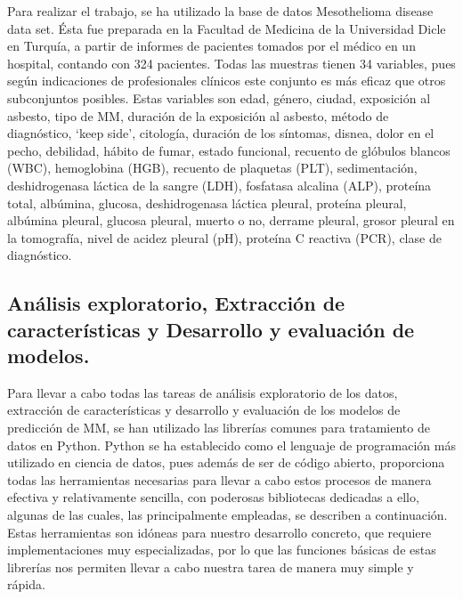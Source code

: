 \documentclass{article}
\begin{document}
Para realizar el trabajo, se ha utilizado la base de datos
Mesothelioma disease data set. Ésta fue preparada en la Facultad de
Medicina de la Universidad Dicle en Turquía, a partir de informes de
pacientes tomados por el médico en un hospital, contando con 324
pacientes. Todas las muestras tienen 34 variables, pues según
indicaciones de profesionales clínicos este conjunto es más eficaz que
otros subconjuntos posibles. Estas variables son edad, género, ciudad,
exposición al asbesto, tipo de MM, duración de la exposición al
asbesto, método de diagnóstico, ‘keep side’, citología, duración de
los síntomas, disnea, dolor en el pecho, debilidad, hábito de fumar,
estado funcional, recuento de glóbulos blancos (WBC), hemoglobina
(HGB), recuento de plaquetas (PLT), sedimentación, deshidrogenasa
láctica de la sangre (LDH), fosfatasa alcalina (ALP), proteína total,
albúmina, glucosa, deshidrogenasa láctica pleural, proteína pleural,
albúmina pleural, glucosa pleural, muerto o no, derrame pleural,
grosor pleural en la tomografía, nivel de acidez pleural (pH),
proteína C reactiva (PCR), clase de diagnóstico.


\subsection{Análisis exploratorio, Extracción de características y Desarrollo y evaluación de modelos.}

Para llevar a cabo todas las tareas de análisis exploratorio de los
datos, extracción de características y desarrollo y evaluación de los
modelos de predicción de MM, se han utilizado las librerías comunes
para tratamiento de datos en Python. Python se ha establecido como el
lenguaje de programación más utilizado en ciencia de datos, pues
además de ser de código abierto, proporciona todas las herramientas
necesarias para llevar a cabo estos procesos de manera efectiva y
relativamente sencilla, con poderosas bibliotecas dedicadas a ello,
algunas de las cuales, las principalmente empleadas, se describen a
continuación. Estas herramientas son idóneas para nuestro desarrollo
concreto, que requiere implementaciones muy especializadas, por lo que
las funciones básicas de estas librerías nos permiten llevar a cabo
nuestra tarea de manera muy simple y rápida.
\end{document}
